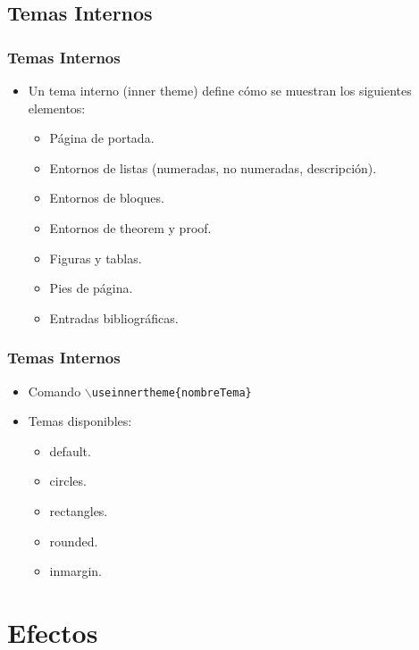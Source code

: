 \documentclass[aspectratio=43]{beamer}%
\begin{document}
\subsection{Temas Internos}
\begin{frame}[fragile]
\frametitle{\textbf{Temas Internos}}
\justifying
 \begin{itemize}\justifying
  \item Un tema interno (inner theme) define cómo se muestran los siguientes elementos:
  \begin{itemize}\justifying
  \item Página de portada.
  \item Entornos de listas (numeradas, no numeradas, descripción).
  \item Entornos de bloques.
  \item Entornos de theorem y proof.
  \item Figuras y tablas.
  \item Pies de página.
  \item Entradas bibliográficas.
\end{itemize}

\end{itemize}

\end{frame}

\begin{frame}[fragile]
\frametitle{\textbf{Temas Internos}}
\justifying
 \begin{itemize}\justifying
  \item Comando \texttt{$\backslash$useinnertheme\{nombreTema\}}
  \item Temas disponibles:
  \begin{itemize}\justifying
  \item default.
  \item circles.
  \item rectangles.
  \item rounded.
  \item inmargin.
\end{itemize}

\end{itemize}

\end{frame}


\section{Efectos}
\end{document}

